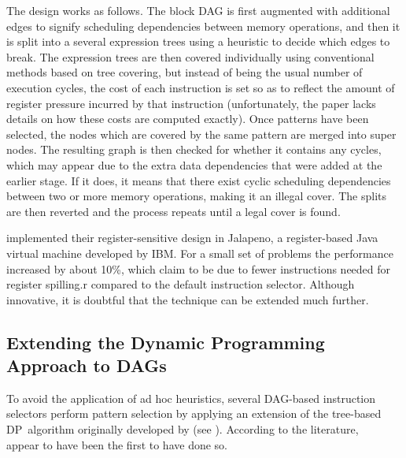 The design works as follows.
%
The \gls{block DAG} is first augmented with
additional \glspl{edge} to signify scheduling dependencies between memory
operations, and then it is split into a several \glspl{expression tree} using a
heuristic to decide which \glspl{edge} to break.
%
The \glspl{expression tree} are
then covered individually using conventional methods based on \gls{tree
  covering}, but instead of being the usual number of execution cycles, the cost
of each \gls{instruction} is set so as to reflect the amount of \gls{register
  pressure} incurred by that instruction (unfortunately, the paper lacks details
on how these costs are computed exactly).
%
Once \glspl{pattern} have been
selected, the \glspl{node} which are covered by the same \gls{pattern} are
merged into \glspl{super node}.
%
The resulting \gls{graph} is then checked for
whether it contains any \glspl{cycle}, which may appear due to the extra data
dependencies that were added at the earlier stage.
%
If it does, it means that
there exist cyclic scheduling dependencies between two or more memory
operations, making it an illegal cover.
%
The splits are then reverted and the
process repeats until a legal cover is found.

\citeauthor{Sarkar2001} implemented their \gls{register}-sensitive design in
\gls{Jalapeno}, a \gls{register}-based \gls{Java} virtual machine developed by
\gls{IBM}.
%
For a small set of problems the performance increased by about 10\%, which
\citeauthor{Sarkar2001} claim to be due to fewer \glspl{instruction} needed for
\gls{register} \gls{spilling.r} compared to the default \gls{instruction
  selector}.
%
Although innovative, it is doubtful that the technique can be
extended much further.


\subsection{Extending the Dynamic Programming Approach to DAGs}

To avoid the application of ad hoc heuristics, several \gls{DAG}-based
\glspl{instruction selector} perform \gls{pattern selection} by applying an
extension of the \gls{tree}-based \gls{DP}~algorithm originally developed by
\textcite{Aho1976a} (see ).
%
According to the literature, \citeauthor{Liem1994}~\cite{Liem1994, Paulin1994,
  Paulin1995} appear to have been the first to have done so.

